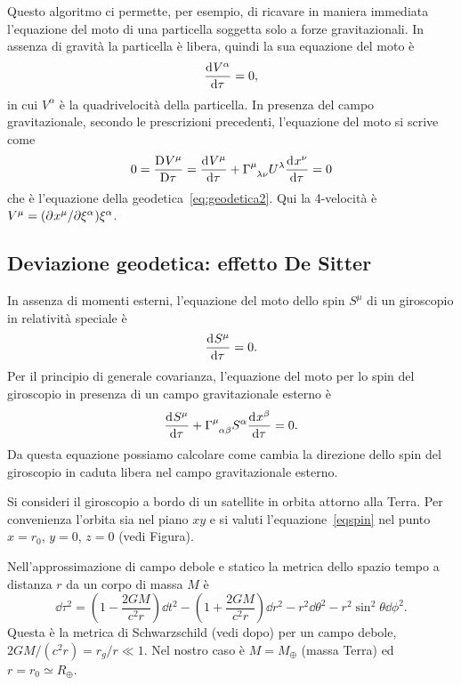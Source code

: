 Questo algoritmo ci permette, per esempio, di ricavare in maniera immediata
l'equazione del moto di una particella soggetta solo a forze gravitazionali.  In
assenza di gravità la particella è libera, quindi la sua equazione del moto è
\begin{equation}
  \frac{{\mathop{}\!\mathrm{d}^{}}V^{\alpha}}{\mathop{}\!\mathrm{d} {\tau}^{}} = 0,
\end{equation}
in cui $V^{\alpha}$ è la quadrivelocità della particella.  In
presenza del campo gravitazionale, secondo le prescrizioni precedenti,
l'equazione del moto si scrive come
\begin{equation}
  0 = \curder{V^{\mu}} = \toder{V^{\mu}}{\tau} +
  \tensor{\Gamma}{^{\mu}_{\lambda\nu}} U^{\lambda} \toder{x^{\nu}}{\tau} = 0
\end{equation}
che è l'equazione della
geodetica~\eqref{eq:geodetica2}.  Qui la 4-velocità è $V^{\mu} =
(\partial^{} x^{\mu} / \partial {\xi^{\alpha}}^{}) \xi^{\alpha}$.

\subsection{Deviazione geodetica: effetto De Sitter}
\label{sec:effetto-de-sitter}

In assenza di momenti esterni, l'equazione del moto dello spin $S^{\mu}$ di un
giroscopio in relatività speciale è
\begin{equation}
  \frac{{\mathop{}\!\mathrm{d}^{}}S^{\mu}}{\mathop{}\!\mathrm{d} {\tau}^{}} = 0.
\end{equation}
Per il principio di generale covarianza, l'equazione del moto per lo spin del
giroscopio in presenza di un campo gravitazionale esterno è
\begin{equation}
  \toder{S^{\mu}}{\tau} + \tensor{\Gamma}{^{\mu}_{\alpha\beta}} S^{\alpha}
  \toder{x^{\beta}}{\tau}= 0.
  \label{eqspin}
\end{equation}
Da questa equazione possiamo calcolare come cambia la direzione dello spin del
giroscopio in caduta libera nel campo gravitazionale esterno.

Si consideri il giroscopio a bordo di un satellite in orbita attorno alla Terra.
Per convenienza l'orbita sia nel piano $xy$ e si valuti
l'equazione~\eqref{eqspin} nel punto $x=r_0$, $y=0$, $z=0$ (vedi Figura).

Nell'approssimazione di campo debole e statico la metrica dello spazio tempo a
distanza $r$ da un corpo di massa $M$ è
\begin{equation}
  \dd\tau^2 = \left(1-\frac{2 G M}{c^2r}\right) \dd t^2 - \left(1+\frac{2 G
      M}{c^2r}\right) \dd r^2 - r^2 \dd \theta^2 - r^2 \sin^2 \theta \dd \phi^2.
  \label{metricadebole}
\end{equation}
Questa è la metrica di Schwarzschild (vedi dopo) per un campo debole, $2GM/(c^2
r) = r_{g}/r\ll 1$.  Nel nostro caso è $M=M_{\oplus}$ (massa Terra) ed $r= r_0
\simeq R_{\oplus}$.

